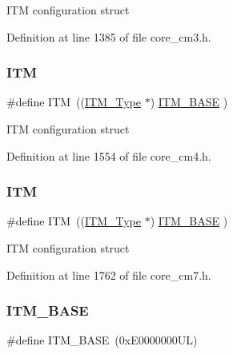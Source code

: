 I\+TM configuration struct 

Definition at line 1385 of file core\+\_\+cm3.\+h.

\mbox{\label{group___c_m_s_i_s__core__base_gabae7cdf882def602cb787bb039ff6a43}} 
\subsubsection{\texorpdfstring{I\+TM}{ITM}\hspace{0.1cm}{\footnotesize\ttfamily [3/4]}}
{\footnotesize\ttfamily \#define I\+TM~((\hyperlink{struct_i_t_m___type}{I\+T\+M\+\_\+\+Type}       $\ast$)     \hyperlink{group___c_m_s_i_s__core__base_gadd76251e412a195ec0a8f47227a8359e}{I\+T\+M\+\_\+\+B\+A\+SE}      )}

I\+TM configuration struct 

Definition at line 1554 of file core\+\_\+cm4.\+h.

\mbox{\label{group___c_m_s_i_s__core__base_gabae7cdf882def602cb787bb039ff6a43}} 
\subsubsection{\texorpdfstring{I\+TM}{ITM}\hspace{0.1cm}{\footnotesize\ttfamily [4/4]}}
{\footnotesize\ttfamily \#define I\+TM~((\hyperlink{struct_i_t_m___type}{I\+T\+M\+\_\+\+Type}       $\ast$)     \hyperlink{group___c_m_s_i_s__core__base_gadd76251e412a195ec0a8f47227a8359e}{I\+T\+M\+\_\+\+B\+A\+SE}      )}

I\+TM configuration struct 

Definition at line 1762 of file core\+\_\+cm7.\+h.

\mbox{\label{group___c_m_s_i_s__core__base_gadd76251e412a195ec0a8f47227a8359e}} 
\subsubsection{\texorpdfstring{I\+T\+M\+\_\+\+B\+A\+SE}{ITM\_BASE}\hspace{0.1cm}{\footnotesize\ttfamily [1/4]}}
{\footnotesize\ttfamily \#define I\+T\+M\+\_\+\+B\+A\+SE~(0x\+E0000000\+U\+L)}

